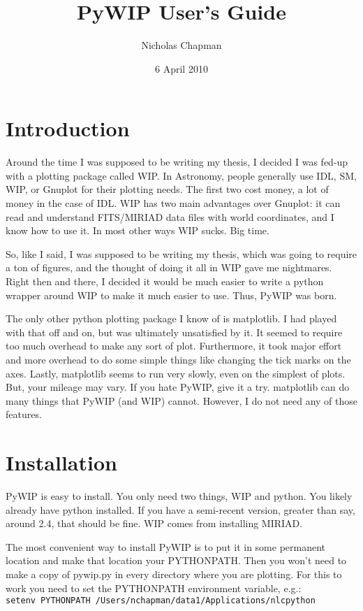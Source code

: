 \documentclass[12pt]{article}
\title{PyWIP User's Guide}
\author{Nicholas Chapman}
\date{6 April 2010}
\newcommand{\pywip}{PyWIP}
\begin{document}
\maketitle
\tableofcontents
\newpage

\section{Introduction}

Around the time I was supposed to be writing my thesis, I decided I was fed-up
with a plotting package called WIP.  In Astronomy, people generally use
IDL, SM, WIP, or Gnuplot for their plotting needs.  The first two cost money,
a lot of money in the case of IDL.  WIP has two main advantages over Gnuplot:
it can read and understand FITS/MIRIAD data files with world coordinates, and
I know how to use it.  In most other ways WIP sucks.  Big time.

So, like I said, I was supposed to be writing my thesis, which was going to
require a ton of figures, and the thought of doing it all in WIP gave me
nightmares.  Right then and there, I decided it would be much easier to write
a python wrapper around WIP to make it much easier to use.  Thus, \pywip{} was
born.

The only other python plotting package I know of is matplotlib.  I had played
with that off and on, but was ultimately unsatisfied by it.  It seemed to
require too much overhead to make any sort of plot.  Furthermore, it took major
effort and more overhead to do some simple things like changing the tick marks
on the axes.  Lastly, matplotlib seems to run very slowly, even on the simplest
of plots.  But, your mileage may vary.  If you hate \pywip{}, give it a try.
matplotlib can do many things that \pywip{} (and WIP) cannot.  However, I do not
need any of those features.

\section{Installation}

\pywip{} is easy to install.  You only need two things, WIP and python.  You
likely already have python installed.  If you have a semi-recent version,
greater than say, around 2.4, that should be fine.  WIP comes from installing
MIRIAD.

The most convenient way to install \pywip{} is to put it in some permanent
location and make that location your PYTHONPATH.  Then you won't need to make a
copy of pywip.py in every directory where you are plotting.  For this to work
you need to set the PYTHONPATH environment variable, e.g.:\\ \texttt{setenv
PYTHONPATH /Users/nchapman/data1/Applications/nlcpython}
\end{document}
